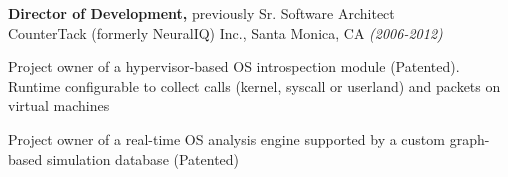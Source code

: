 \documentclass[margin]{res}
\begin{document}
\begin{resume}
{\bf Director of Development,} previously Sr. Software Architect \\
CounterTack (formerly NeuralIQ) Inc., Santa Monica, CA {\em (2006-2012)}
\begin{list}{}{\leftmargin=1.5em \topsep=5pt \partopsep=0pt \parsep=2.5pt}
  \item Project owner of a hypervisor-based OS introspection module
    (Patented). Runtime configurable to collect
    calls (kernel, syscall or userland) and packets on virtual machines
  \item Project owner of a real-time OS analysis engine supported by a
    custom graph-based simulation database (Patented)
\end{list}




\end{resume}
\end{document}
